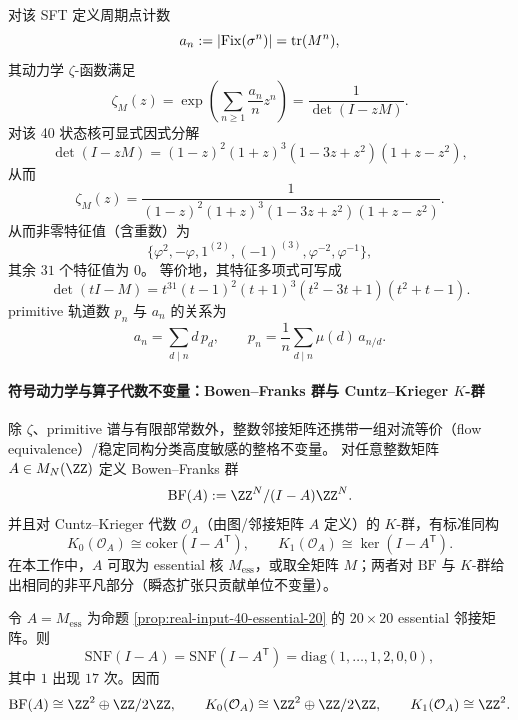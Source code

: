 

对该 SFT 定义周期点计数
\[
a_n:=|{\rm Fix}(\sigma^n)|=\operatorname{tr}(M^n),
\]
其动力学 $\zeta$-函数满足
\[
\zeta_M(z)=\exp\!\left(\sum_{n\ge 1}\frac{a_n}{n}z^n\right)=\frac{1}{\det(I-zM)}.
\]
对该 40 状态核可显式因式分解
\[
\det(I-zM)=(1-z)^2(1+z)^3(1-3z+z^2)(1+z-z^2),
\]
从而
\[
\zeta_M(z)=\frac{1}{(1-z)^2(1+z)^3(1-3z+z^2)(1+z-z^2)}.
\]
从而非零特征值（含重数）为
\[
\{\varphi^2,-\varphi,1^{(2)},(-1)^{(3)},\varphi^{-2},\varphi^{-1}\},
\]
其余 $31$ 个特征值为 $0$。
等价地，其特征多项式可写成
\[
\det(tI-M)=t^{31}(t-1)^2(t+1)^3(t^2-3t+1)(t^2+t-1).
\]
primitive 轨道数 $p_n$ 与 $a_n$ 的关系为
\[
a_n=\sum_{d\mid n} d\,p_d,\qquad
p_n=\frac{1}{n}\sum_{d\mid n}\mu(d)\,a_{n/d}.
\]

\paragraph{符号动力学与算子代数不变量：Bowen--Franks 群与 Cuntz--Krieger \texorpdfstring{$K$}{K}-群}
除 $\zeta$、primitive 谱与有限部常数外，整数邻接矩阵还携带一组对流等价（flow equivalence）/稳定同构分类高度敏感的整格不变量。
对任意整数矩阵 $A\in M_N(\ZZ)$ 定义 Bowen--Franks 群
\[
\mathrm{BF}(A):=\ZZ^N/(I-A)\ZZ^N.
\]
并且对 Cuntz--Krieger 代数 $\mathcal O_A$（由图/邻接矩阵 $A$ 定义）的 $K$-群，有标准同构
\[
K_0(\mathcal O_A)\cong \mathrm{coker}(I-A^\mathsf T),\qquad
K_1(\mathcal O_A)\cong \ker(I-A^\mathsf T).
\]
在本工作中，$A$ 可取为 essential 核 $M_{\mathrm{ess}}$，或取全矩阵 $M$；两者对 $\mathrm{BF}$ 与 $K$-群给出相同的非平凡部分（瞬态扩张只贡献单位不变量）。

\begin{proposition}\label{prop:real-input-40-bf-ktheory}
令 $A=M_{\mathrm{ess}}$ 为命题 \ref{prop:real-input-40-essential-20} 的 $20\times 20$ essential 邻接矩阵。则
\[
\mathrm{SNF}(I-A)=\mathrm{SNF}(I-A^\mathsf T)=\mathrm{diag}(1,\dots,1,2,0,0),
\]
其中 $1$ 出现 $17$ 次。因而
\[
\mathrm{BF}(A)\cong \ZZ^2\oplus \ZZ/2\ZZ,
\qquad
K_0(\mathcal O_A)\cong \ZZ^2\oplus \ZZ/2\ZZ,
\qquad
K_1(\mathcal O_A)\cong \ZZ^2.
\]
\end{proposition}

